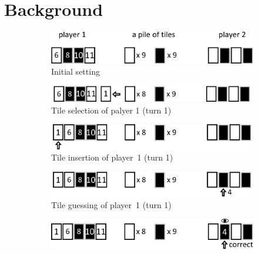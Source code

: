 \section{Background}

\begin{figure}
\begin{subfigure}[b]{0.95\columnwidth}
\includegraphics[width=0.95\columnwidth]{figures/DVC_procedure_1.pdf}
\caption{Initial setting}
\label{fig:DVC_procedure_1}
\end{subfigure}
\par\smallskip
\begin{subfigure}[b]{0.95\columnwidth}
\includegraphics[width=0.95\columnwidth]{figures/DVC_procedure_2.pdf}
\caption{Tile selection of palyer 1 (turn 1)}
\label{fig:DVC_procedure_2}
\end{subfigure}
\par\smallskip
\begin{subfigure}[b]{0.95\columnwidth}
\includegraphics[width=0.95\columnwidth]{figures/DVC_procedure_3.pdf}
\caption{Tile insertion of player~1 (turn 1)}
\label{fig:DVC_procedure_3}
\end{subfigure}
\par\smallskip
\begin{subfigure}[b]{0.95\columnwidth}
\includegraphics[width=0.95\columnwidth]{figures/DVC_procedure_4.pdf}
\caption{Tile guessing of player~1 (turn 1)}
\label{fig:DVC_procedure_4}
\end{subfigure}
\par\smallskip
\begin{subfigure}[b]{0.95\columnwidth}
\includegraphics[width=0.95\columnwidth]{figures/DVC_procedure_5.pdf}

\end{subfigure}
\end{figure}
